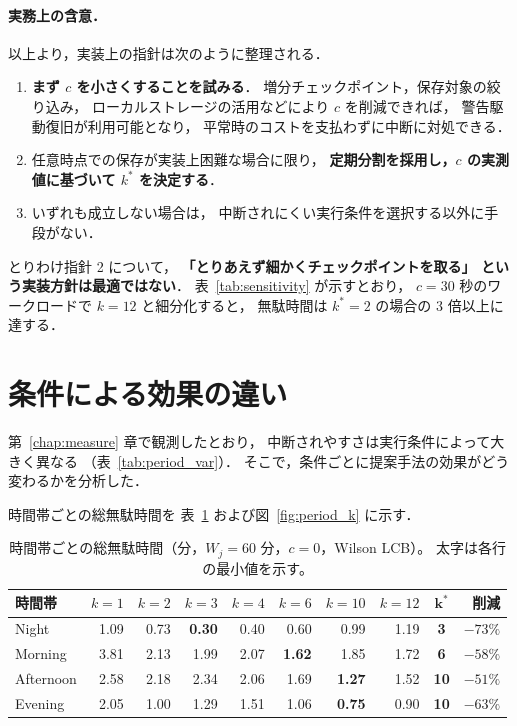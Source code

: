 \documentclass[11pt,a4paper]{ltjsreport}
\begin{document}
\paragraph{実務上の含意．}
以上より，実装上の指針は次のように整理される．

\begin{enumerate}
  \item \textbf{まず $c$ を小さくすることを試みる}．
        増分チェックポイント，保存対象の絞り込み，
        ローカルストレージの活用などにより $c$ を削減できれば，
        警告駆動復旧が利用可能となり，
        平常時のコストを支払わずに中断に対処できる．
  \item 任意時点での保存が実装上困難な場合に限り，
        \textbf{定期分割を採用し，$c$ の実測値に基づいて
        $k^{*}$ を決定する}．
  \item いずれも成立しない場合は，
        中断されにくい実行条件を選択する以外に手段がない．
\end{enumerate}

とりわけ指針 2 について，
\textbf{「とりあえず細かくチェックポイントを取る」
という実装方針は最適ではない}．
表~\ref{tab:sensitivity} が示すとおり，
$c = 30$ 秒のワークロードで $k = 12$ と細分化すると，
無駄時間は $k^{*} = 2$ の場合の $3$ 倍以上に達する．

\section{条件による効果の違い}
\label{sec:condition}

第~\ref{chap:measure} 章で観測したとおり，
中断されやすさは実行条件によって大きく異なる
（表~\ref{tab:period_var}）．
そこで，条件ごとに提案手法の効果がどう変わるかを分析した．

時間帯ごとの総無駄時間を
表~\ref{tab:period_k} および図~\ref{fig:period_k} に示す．

\begin{table}[htbp]
\centering
\caption{時間帯ごとの総無駄時間（分，$W_j = 60$ 分，$c=0$，Wilson LCB）。
太字は各行の最小値を示す。}
\label{tab:period_k}
\small
\begin{tabular}{@{}lrrrrrrrcr@{}}
\toprule
時間帯 & $k{=}1$ & $k{=}2$ & $k{=}3$ & $k{=}4$ & $k{=}6$ & $k{=}10$ & $k{=}12$
 & $\mathbf{k^{*}}$ & 削減 \\
\midrule
Night     & 1.09 & 0.73 & \textbf{0.30} & 0.40 & 0.60 & 0.99 & 1.19
 & \textbf{3}  & $-73\%$ \\
Morning   & 3.81 & 2.13 & 1.99 & 2.07 & \textbf{1.62} & 1.85 & 1.72
 & \textbf{6}  & $-58\%$ \\
Afternoon & 2.58 & 2.18 & 2.34 & 2.06 & 1.69 & \textbf{1.27} & 1.52
 & \textbf{10} & $-51\%$ \\
Evening   & 2.05 & 1.00 & 1.29 & 1.51 & 1.06 & \textbf{0.75} & 0.90
 & \textbf{10} & $-63\%$ \\
\bottomrule
\end{tabular}
\end{table}
\end{document}
